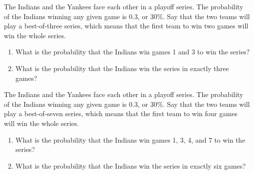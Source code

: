 \documentclass[nooutcomes]{ximera}
\begin{document}
\begin{problem}
The Indians and the Yankees face each other in a playoff series.  The probability of the Indians winning any given game is 0.3, or 30\%.  Say that the two teams will play a best-of-three series, which means that the first team to win two games will win the whole series.

\begin{enumerate}
\item What is the probability that the Indians win games 1 and 3 to win the series?
\item What is the probability that the Indians win the series in exactly three games?
\end{enumerate}
\end{problem}
\vfill
\begin{problem}
The Indians and the Yankees face each other in a playoff series.  The probability of the Indians winning any given game is 0.3, or 30\%.  Say that the two teams will play a best-of-seven series, which means that the first team to win four games will win the whole series.

\begin{enumerate}
\item What is the probability that the Indians win games 1, 3, 4, and 7 to win the series?
\item What is the probability that the Indians win the series in exactly six games?
\end{enumerate}
\end{problem}
\vfill

\newpage
\end{document}
